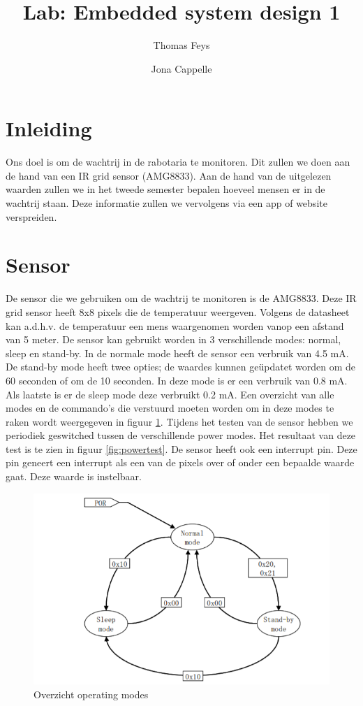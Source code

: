 \documentclass[]{article}
\title{Lab: Embedded system design 1}
\author{Thomas Feys \and Jona Cappelle}
\begin{document}
\maketitle

\newpage

\tableofcontents

\newpage

\section{Inleiding}
Ons doel is om de wachtrij in de rabotaria te monitoren. Dit zullen we doen aan de hand van een IR grid sensor (AMG8833). Aan de hand van de uitgelezen waarden zullen we in het tweede semester bepalen hoeveel mensen er in de wachtrij staan. Deze informatie zullen we vervolgens via een app of website verspreiden.


\section{Sensor}
De sensor die we gebruiken om de wachtrij te monitoren is de AMG8833. Deze IR grid sensor heeft 8x8 pixels die de temperatuur weergeven. Volgens de datasheet kan a.d.h.v. de temperatuur een mens waargenomen worden vanop een afstand van 5 meter. De sensor kan gebruikt worden in 3 verschillende modes: normal, sleep en stand-by. In de normale mode heeft de sensor een verbruik van 4.5 mA. De stand-by mode heeft twee opties; de waardes kunnen geüpdatet worden om de 60 seconden of om de 10 seconden. In deze mode is er een verbruik van 0.8 mA. Als laatste is er de sleep mode deze verbruikt 0.2 mA. Een overzicht van alle modes en de commando's die verstuurd moeten worden om in deze modes te raken wordt weergegeven in figuur \ref{fig:operatingmodes}. Tijdens het testen van de sensor hebben we periodiek geswitched tussen de verschillende power modes. Het resultaat van deze test is te zien in figuur \ref{fig:powertest}. De sensor heeft ook een interrupt pin. Deze pin geneert een interrupt als een van de pixels over of onder een bepaalde waarde gaat. Deze waarde is instelbaar.	
\begin{figure}[!ht]
	\centering
	\includegraphics[width=\columnwidth]{operatingmodes.png}
	\caption{Overzicht operating modes}
	\label{fig:operatingmodes}
\end{figure}
\end{document}
